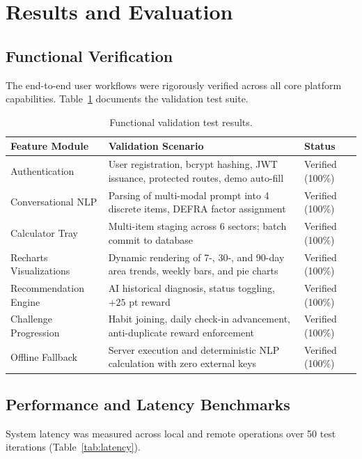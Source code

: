 \documentclass[12pt,a4paper]{article}
\begin{document}
\section{Results and Evaluation}

\subsection{Functional Verification}
The end-to-end user workflows were rigorously verified across all core platform capabilities. Table~\ref{tab:verification} documents the validation test suite.

\begin{table}[htbp]
\centering
\small
\begin{tabular}{@{}p{3.8cm}p{6.8cm}p{2.6cm}@{}}
\toprule
\textbf{Feature Module} & \textbf{Validation Scenario} & \textbf{Status} \\ \midrule
Authentication & User registration, bcrypt hashing, JWT issuance, protected routes, demo auto-fill & Verified (100\%) \\ \addlinespace
Conversational NLP & Parsing of multi-modal prompt into 4 discrete items, DEFRA factor assignment & Verified (100\%) \\ \addlinespace
Calculator Tray & Multi-item staging across 6 sectors; batch commit to database & Verified (100\%) \\ \addlinespace
Recharts Visualizations & Dynamic rendering of 7-, 30-, and 90-day area trends, weekly bars, and pie charts & Verified (100\%) \\ \addlinespace
Recommendation Engine & AI historical diagnosis, status toggling, $+25$ pt reward & Verified (100\%) \\ \addlinespace
Challenge Progression & Habit joining, daily check-in advancement, anti-duplicate reward enforcement & Verified (100\%) \\ \addlinespace
Offline Fallback & Server execution and deterministic NLP calculation with zero external keys & Verified (100\%) \\ \bottomrule
\end{tabular}
\caption{Functional validation test results.}
\label{tab:verification}
\end{table}

\subsection{Performance and Latency Benchmarks}
System latency was measured across local and remote operations over 50 test iterations (Table~\ref{tab:latency}).
\end{document}
